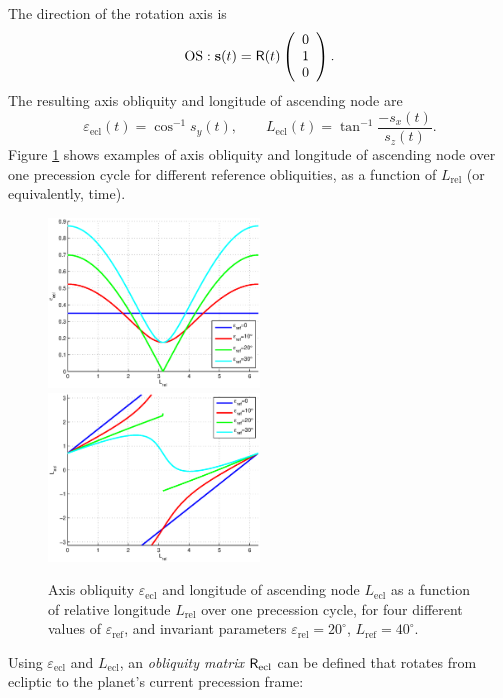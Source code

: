\documentclass[a4paper]{article}
\renewcommand{\vec}[1]{\ensuremath \mathbf{#1}}
\newcommand{\mat}[1]{\ensuremath \mathsf{#1}}
\begin{document}
The direction of the rotation axis is
\begin{equation}
\mathrm{OS}: \vec{s}(t) = \mat{R}(t) \left(\begin{array}{c}
0 \\ 1 \\ 0 \end{array}\right).
\end{equation}
The resulting axis obliquity and longitude of ascending node are
\begin{equation}\label{eq:eps_ecl}
\varepsilon_\mathrm{ecl}(t) = \cos^{-1} s_y(t), \qquad
L_\mathrm{ecl}(t) = \tan^{-1} \frac{-s_x(t)}{s_z(t)}.
\end{equation}
Figure \ref{fig:plots} shows examples of axis obliquity and longitude of ascending node over one precession cycle for different reference obliquities, as a function of $L_\mathrm{rel}$ (or equivalently, time).
\begin{figure}
\includegraphics[width=0.5\textwidth]{fig3a.eps}
\includegraphics[width=0.5\textwidth]{fig3b.eps}
\caption{Axis obliquity $\varepsilon_\mathrm{ecl}$ and longitude of ascending node $L_\mathrm{ecl}$ as a function of relative longitude $L_\mathrm{rel}$ over one precession cycle, for four different values of $\varepsilon_\mathrm{ref}$, and invariant parameters $\varepsilon_\mathrm{rel} = 20^\circ$, $L_\mathrm{ref}=40^\circ$.}
\label{fig:plots}
\end{figure}
Using $\varepsilon_\mathrm{ecl}$ and $L_\mathrm{ecl}$, an \emph{obliquity matrix} $\mat{R}_\mathrm{ecl}$ can be defined that rotates from ecliptic to the planet's current precession frame:
\end{document}
